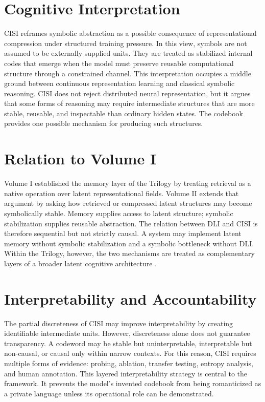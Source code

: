 \section{Cognitive Interpretation}
CISI reframes symbolic abstraction as a possible consequence of representational compression under structured training pressure. In this view, symbols are not assumed to be externally supplied units. They are treated as stabilized internal codes that emerge when the model must preserve reusable computational structure through a constrained channel.
This interpretation occupies a middle ground between continuous representation learning and classical symbolic reasoning. CISI does not reject distributed neural representation, but it argues that some forms of reasoning may require intermediate structures that are more stable, reusable, and inspectable than ordinary hidden states. The codebook provides one possible mechanism for producing such structures.
\section{Relation to Volume I}
Volume I established the memory layer of the Trilogy by treating retrieval as a native operation over latent representational fields. Volume II extends that argument by asking how retrieved or compressed latent structures may become symbolically stable. Memory supplies access to latent structure; symbolic stabilization supplies reusable abstraction.
The relation between DLI and CISI is therefore sequential but not strictly causal. A system may implement latent memory without symbolic stabilization and a symbolic bottleneck without DLI. Within the Trilogy, however, the two mechanisms are treated as complementary layers of a broader latent cognitive architecture \cite{Laird2012}.
\section{Interpretability and Accountability}
The partial discreteness of CISI may improve interpretability by creating identifiable intermediate units. However, discreteness alone does not guarantee transparency. A codeword may be stable but uninterpretable, interpretable but non-causal, or causal only within narrow contexts. For this reason, CISI requires multiple forms of evidence: probing, ablation, transfer testing, entropy analysis, and human annotation.
This layered interpretability strategy is central to the framework. It prevents the model's invented codebook from being romanticized as a private language unless its operational role can be demonstrated.
